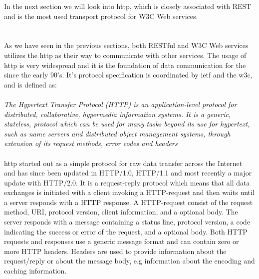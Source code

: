  In the next section we will look into \gls{http}, which is closely associated
 with REST and is the most used transport protocol for W3C Web services.

\section{}

As we have seen in the previous sections, both RESTful and W3C Web services
utilizes the \gls{http} as their way to communicate with other services. The
usage of \gls{http} is very widespread and it is the foundation of data
communication for the  since the early 90's. It's protocol
specification is coordinated by \gls{ietf} and the \gls{w3c}, and is defined
as\cite{rfc-2616}:

\paragraph{}
\textit{
    The Hypertext Transfer Protocol (HTTP) is an application-level
    protocol for distributed, collaborative, hypermedia information
    systems. It is a generic, stateless, protocol which can be used for
    many tasks beyond its use for hypertext, such as name servers and
    distributed object management systems, through extension of its
    request methods, error codes and headers
}

\paragraph{}

\gls{http} started out as a simple protocol for raw data transfer across the
Internet and has since been updated in HTTP/1.0, HTTP/1.1 and most recently a
major update with HTTP/2.0. It is a request-reply protocol which means that all
data exchanges is initiated with a client invoking a HTTP-request and then waits
until a server responds with a HTTP response. A HTTP-request consist of the
request method, URI, protocol version, client information, and a optional body.
The server responds with a message containing a status line, protocol version, a
code indicating the success or error of the request, and a optional body. Both
HTTP requests and responses use a generic message format and can contain zero or
more HTTP headers. Headers are used to provide information about the
request/reply or about the message body, e.g information about the encoding and
caching information.

